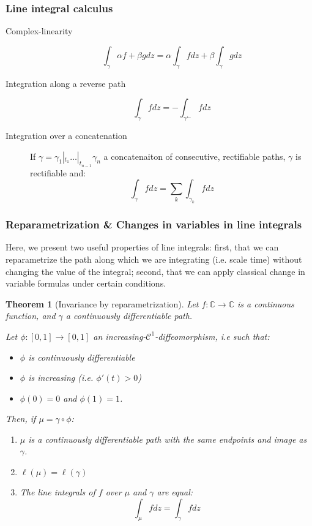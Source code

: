 \documentclass{article}
\newtheorem*{thm*}{Theorem}
\begin{document}
\subsubsection{Line integral calculus}
\begin{description}
    \item[Complex-linearity] $$\int_\gamma \alpha f + \beta g dz = \alpha \int_\gamma fdz + \beta \int_\gamma gdz$$
    \item[Integration along a reverse path] $$\int_\gamma fdz = - \int_{\gamma^{\leftarrow}}fdz$$
    \item[Integration over a concatenation] If $\gamma = \gamma_1 |_{t_1} \dots |_{t_{n-1}} \gamma_n$ a concatenaiton of consecutive, rectifiable paths, $\gamma$ is rectifiable and:
        $$\int_\gamma fdz = \sum_k \int_{\gamma_k}fdz$$
\end{description}

\subsubsection{Reparametrization \& Changes in variables in line integrals}
Here, we present two useful properties of line integrals: first, that we can reparametrize the path along which we are integrating (i.e. scale time) without changing the value of the integral; second, that we can apply classical change in variable formulas under certain conditions.

\begin{thm*}[Invariance by reparametrization]
Let $f: \mathbb{C} \rightarrow \mathbb{C}$ is a continuous function, and $\gamma$ a continuously differentiable path.

Let $\phi: [0,1] \rightarrow [0,1]$ an increasing-$\mathcal{C}^1$-diffeomorphism, i.e such that:
\begin{itemize}
    \item $\phi$ is continuously differentiable
    \item $\phi$ is increasing (i.e. $\phi'(t) > 0$)
    \item $\phi(0) = 0$ and $\phi(1)=1$.
\end{itemize}

Then, if $\mu = \gamma \circ \phi$:
\begin{enumerate}
    \item $\mu$ is a continuously differentiable path with the same endpoints and image as $\gamma$.
    \item $\ell(\mu) = \ell(\gamma)$
    \item The line integrals of $f$ over $\mu$ and $\gamma$ are equal:
        $$ \int_\mu fdz = \int_\gamma fdz $$
\end{enumerate}
\end{thm*}
\end{document}
